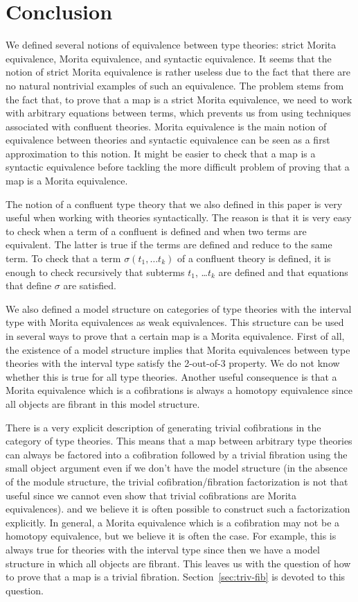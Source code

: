 \documentclass[reqno]{amsart}
\theoremstyle{definition}
\theoremstyle{remark}
\numberwithin{figure}{section}
\begin{document}
\section{Conclusion}
\label{sec:conclusion}

We defined several notions of equivalence between type theories: strict Morita equivalence, Morita equivalence, and syntactic equivalence.
It seems that the notion of strict Morita equivalence is rather useless due to the fact that there are no natural nontrivial examples of such an equivalence.
The problem stems from the fact that, to prove that a map is a strict Morita equivalence, we need to work with arbitrary equations between terms, which prevents us from using techniques associated with confluent theories.
Morita equivalence is the main notion of equivalence between theories and syntactic equivalence can be seen as a first approximation to this notion.
It might be easier to check that a map is a syntactic equivalence before tackling the more difficult problem of proving that a map is a Morita equivalence.

The notion of a confluent type theory that we also defined in this paper is very useful when working with theories syntactically.
The reason is that it is very easy to check when a term of a confluent is defined and when two terms are equivalent.
The latter is true if the terms are defined and reduce to the same term.
To check that a term $\sigma(t_1, \ldots t_k)$ of a confluent theory is defined, it is enough to check recursively that subterms $t_1$, \ldots $t_k$ are defined and that equations that define $\sigma$ are satisfied.

We also defined a model structure on categories of type theories with the interval type with Morita equivalences as weak equivalences.
This structure can be used in several ways to prove that a certain map is a Morita equivalence.
First of all, the existence of a model structure implies that Morita equivalences between type theories with the interval type satisfy the 2-out-of-3 property.
We do not know whether this is true for all type theories.
Another useful consequence is that a Morita equivalence which is a cofibrations is always a homotopy equivalence since all objects are fibrant in this model structure.

There is a very explicit description of generating trivial cofibrations in the category of type theories.
This means that a map between arbitrary type theories can always be factored into a cofibration followed by a trivial fibration using the small object argument even if we don't have the model structure
(in the absence of the module structure, the trivial cofibration/fibration factorization is not that useful since we cannot even show that trivial cofibrations are Morita equivalences).
and we believe it is often possible to construct such a factorization explicitly.
In general, a Morita equivalence which is a cofibration may not be a homotopy equivalence, but we believe it is often the case.
For example, this is always true for theories with the interval type since then we have a model structure in which all objects are fibrant.
This leaves us with the question of how to prove that a map is a trivial fibration.
Section~\ref{sec:triv-fib} is devoted to this question.
\end{document}
